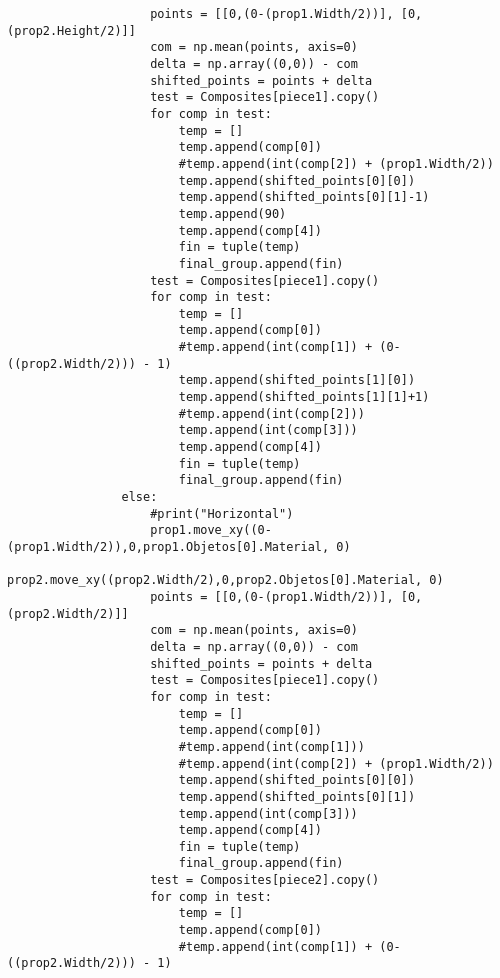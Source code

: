 \begin{verbatim}
                    points = [[0,(0-(prop1.Width/2))], [0,(prop2.Height/2)]]
                    com = np.mean(points, axis=0)
                    delta = np.array((0,0)) - com
                    shifted_points = points + delta
                    test = Composites[piece1].copy()
                    for comp in test:
                        temp = []
                        temp.append(comp[0])
                        #temp.append(int(comp[2]) + (prop1.Width/2))
                        temp.append(shifted_points[0][0])
                        temp.append(shifted_points[0][1]-1)
                        temp.append(90)
                        temp.append(comp[4])
                        fin = tuple(temp)
                        final_group.append(fin)
                    test = Composites[piece1].copy()
                    for comp in test:
                        temp = []
                        temp.append(comp[0])
                        #temp.append(int(comp[1]) + (0-((prop2.Width/2))) - 1)
                        temp.append(shifted_points[1][0])
                        temp.append(shifted_points[1][1]+1)
                        #temp.append(int(comp[2]))
                        temp.append(int(comp[3]))
                        temp.append(comp[4])
                        fin = tuple(temp)
                        final_group.append(fin)
                else:
                    #print("Horizontal")
                    prop1.move_xy((0-(prop1.Width/2)),0,prop1.Objetos[0].Material, 0)
                    prop2.move_xy((prop2.Width/2),0,prop2.Objetos[0].Material, 0)
                    points = [[0,(0-(prop1.Width/2))], [0,(prop2.Width/2)]]
                    com = np.mean(points, axis=0)
                    delta = np.array((0,0)) - com
                    shifted_points = points + delta
                    test = Composites[piece1].copy()
                    for comp in test:
                        temp = []
                        temp.append(comp[0])
                        #temp.append(int(comp[1]))
                        #temp.append(int(comp[2]) + (prop1.Width/2))
                        temp.append(shifted_points[0][0])
                        temp.append(shifted_points[0][1])
                        temp.append(int(comp[3]))
                        temp.append(comp[4])
                        fin = tuple(temp)
                        final_group.append(fin)
                    test = Composites[piece2].copy()
                    for comp in test:
                        temp = []
                        temp.append(comp[0])
                        #temp.append(int(comp[1]) + (0-((prop2.Width/2))) - 1)

\end{verbatim}
